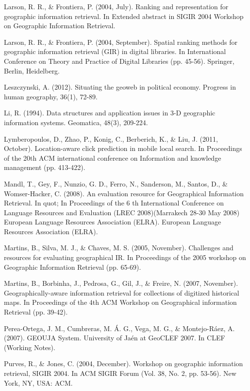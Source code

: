 \documentclass{llncs}
\begin{document}
\begin{thebibliography}{}
Larson, R. R., \& Frontiera, P. (2004, July). Ranking and representation for
geographic information retrieval. In Extended abstract in SIGIR 2004 Workshop
on Geographic Information Retrieval.

Larson, R. R., \& Frontiera, P. (2004, September). Spatial ranking methods for
geographic information retrieval (GIR) in digital libraries. In International
Conference on Theory and Practice of Digital Libraries (pp. 45-56). Springer,
Berlin, Heidelberg.

Leszczynski, A. (2012). Situating the geoweb in political economy.
Progress in human geography, 36(1), 72-89.

Li, R. (1994). Data structures and application issues in 3-D geographic
information systems. Geomatica, 48(3), 209-224.

Lymberopoulos, D., Zhao, P., Konig, C., Berberich, K., \& Liu, J.
(2011, October). Location-aware click prediction in mobile local search. In
Proceedings of the 20th ACM international conference on Information and
knowledge management (pp. 413-422).

Mandl, T., Gey, F., Nunzio, G. D., Ferro, N., Sanderson, M., Santos, D., \&
Womser-Hacker, C. (2008). An evaluation resource for Geographical Information
Retrieval. In quot; In Proceedings of the 6 th International Conference on
Language Resources and Evaluation (LREC 2008)(Marrakech 28-30 May 2008)
European Language Resources Association (ELRA). European Language Resources
Association (ELRA).

Martins, B., Silva, M. J., \& Chaves, M. S. (2005, November). Challenges and
resources for evaluating geographical IR. In Proceedings of the 2005 workshop
on Geographic Information Retrieval (pp. 65-69).

Martins, B., Borbinha, J., Pedrosa, G., Gil, J., \& Freire, N. (2007, November).
Geographically-aware information retrieval for collections of digitized
historical maps. In Proceedings of the 4th ACM Workshop on Geographical
information Retrieval (pp. 39-42).

Perea-Ortega, J. M., Cumbreras, M. Á. G., Vega, M. G., \&
Montejo-Ráez, A. (2007). GEOUJA System. University of Jaén at GeoCLEF 2007. In
CLEF (Working Notes).

Purves, R., \& Jones, C. (2004, December). Workshop on geographic information
retrieval, SIGIR 2004. In ACM SIGIR Forum (Vol. 38, No. 2, pp. 53-56). New
York, NY, USA: ACM.


\end{thebibliography}
\end{document}

